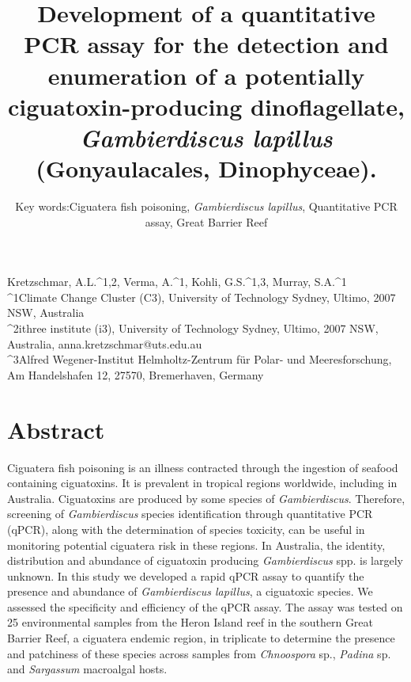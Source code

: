 \documentclass[12pt]{article}
\title{Development of a quantitative PCR assay for the detection and enumeration of a potentially ciguatoxin-producing dinoflagellate, \emph{Gambierdiscus lapillus} (Gonyaulacales, Dinophyceae).} %
\author{Key words:Ciguatera fish poisoning, \emph{Gambierdiscus lapillus}, Quantitative PCR assay, Great Barrier Reef}
\date{}
\begin{document}
\maketitle
Kretzschmar, A.L.^{1,2}, Verma, A.^{1}, Kohli, G.S.^{1,3}, Murray, S.A.^{1}\\
^{1}Climate Change Cluster (C3), University of Technology Sydney, Ultimo, 2007 NSW, Australia\\
^{2}ithree institute (i3), University of Technology Sydney, Ultimo, 2007 NSW, Australia, anna.kretzschmar@uts.edu.au\\
^{3}Alfred Wegener-Institut Helmholtz-Zentrum für Polar- und Meeresforschung, Am Handelshafen 12, 27570, Bremerhaven, Germany

\newpage
\section*{Abstract}
Ciguatera fish poisoning is an illness contracted through the ingestion of seafood containing ciguatoxins. 
It is prevalent in tropical regions worldwide, including in Australia. 
Ciguatoxins are produced by some species of \emph{Gambierdiscus}. 
Therefore, screening of \emph{Gambierdiscus} species identification through quantitative PCR (qPCR), along with the determination of species toxicity, can be useful in monitoring potential ciguatera risk in these regions. 
In Australia, the identity, distribution and abundance of ciguatoxin producing \textit{Gambierdiscus} spp. is largely unknown. 
In this study we developed a rapid qPCR assay to quantify the presence and abundance of \textit{Gambierdiscus lapillus}, a ciguatoxic species. %
We assessed the specificity and efficiency of the qPCR assay. %
The assay was tested on 25 environmental samples from the Heron Island reef in the southern Great Barrier Reef, a ciguatera endemic region, in triplicate to determine the presence and patchiness of these species across samples from \textit{Chnoospora} sp., \textit{Padina} sp. and \textit{Sargassum} macroalgal hosts.  


\newpage
\end{document}
